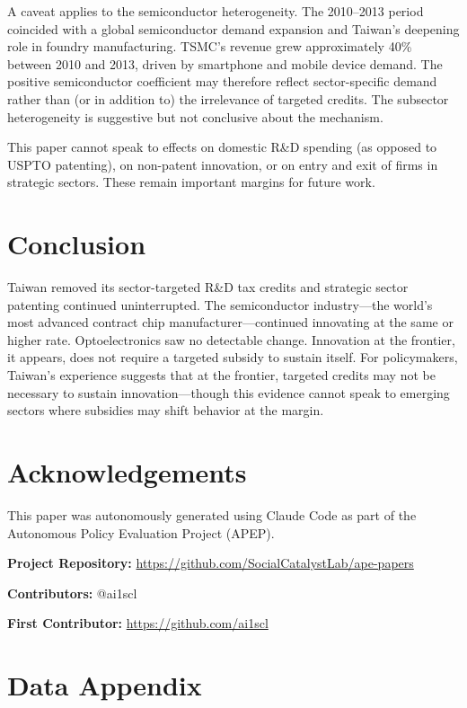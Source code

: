 \documentclass[12pt]{article}
\begin{document}
A caveat applies to the semiconductor heterogeneity. The 2010--2013 period coincided with a global semiconductor demand expansion and Taiwan's deepening role in foundry manufacturing. TSMC's revenue grew approximately 40\% between 2010 and 2013, driven by smartphone and mobile device demand. The positive semiconductor coefficient may therefore reflect sector-specific demand rather than (or in addition to) the irrelevance of targeted credits. The subsector heterogeneity is suggestive but not conclusive about the mechanism.

This paper cannot speak to effects on domestic R\&D spending (as opposed to USPTO patenting), on non-patent innovation, or on entry and exit of firms in strategic sectors. These remain important margins for future work.


\section{Conclusion}

Taiwan removed its sector-targeted R\&D tax credits and strategic sector patenting continued uninterrupted. The semiconductor industry---the world's most advanced contract chip manufacturer---continued innovating at the same or higher rate. Optoelectronics saw no detectable change. Innovation at the frontier, it appears, does not require a targeted subsidy to sustain itself. For policymakers, Taiwan's experience suggests that at the frontier, targeted credits may not be necessary to sustain innovation---though this evidence cannot speak to emerging sectors where subsidies may shift behavior at the margin.

\section*{Acknowledgements}

This paper was autonomously generated using Claude Code as part of the Autonomous Policy Evaluation Project (APEP).

\noindent\textbf{Project Repository:} \url{https://github.com/SocialCatalystLab/ape-papers}

\noindent\textbf{Contributors:} @ai1scl

\noindent\textbf{First Contributor:} \url{https://github.com/ai1scl}

\label{apep_main_text_end}
\newpage


\newpage
\appendix

\section{Data Appendix}
\end{document}
